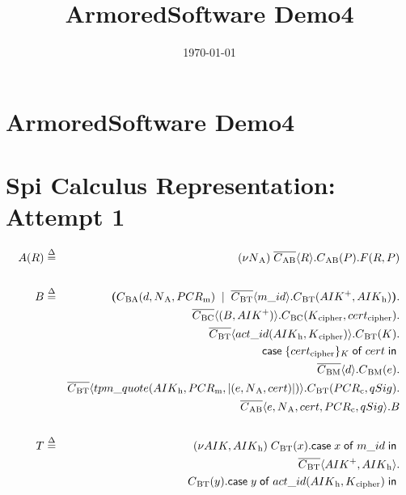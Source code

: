 \documentclass[12pt]{report}
\begin{document}
\title{ArmoredSoftware Demo4}
\author{}%
\date{\today}



\section*{ArmoredSoftware Demo4 }




\section*{Spi Calculus Representation: Attempt 1}

\begin{eqnarray*}
  \app(R) & \defs & \bind{\nonce{\app}} \snd{\channel{\app \att}}{\req}.\rcv{\channel{\app \att}}{\resp} . F(\req,\resp) 
\\
\\
  \att & \defs & \textbf{(}\rcv{\channel{\att \app}}{\evd, \nonce{\app}, \pmask} \comp 
    \snd{\channel{\att \tp}}{m\_id} . \rcv{\channel{\att \tp}}{\public{AIK}, \aikh} \textbf{)} . \\
    & & \snd{\channel{\att \ca}}{(\att, \public{AIK})} . \rcv{\channel{\att \ca}}{\k\textsubscript{cipher}, cert\textsubscript{cipher}} . \\
    & & \snd{\channel{\att \tp}}{act\_id(\aikh, \k\textsubscript{cipher})} . \rcv{\channel{\att \tp}}{\k} . \\
    & & \ccase{\crypt{cert\textsubscript{cipher}}{\k}}{cert}{} \\  %
    & & \snd{\channel{\att \mea}}{\evd} . \rcv{\channel{\att \mea}}{\eve} . \\
    & & \snd{\channel{\att \tp}}{tpm\_quote(\aikh, \pmask, \hash{(\eve, \nonce{\app}, cert)})} . \rcv{\channel{\att \tp}}{\pcomp, qSig} . \\
    & & \snd{\channel{\app \att}}{\eve, \nonce{\app}, cert, \pcomp, qSig} . \att 
\\
\\
  \tp & \defs & \bind{AIK, \aikh} \rcv{\channel{\att \tp}}{x} . \tcase{x}{m\_id} \\ %
  & & \snd{\channel{\att \tp}}{\public{AIK}, \aikh} . \\
  & & \rcv{\channel{\att \tp}}{y} . \tcase{y}{act\_id(\aikh, \k\textsubscript{cipher})} \\

\end{eqnarray*}
\end{document}
